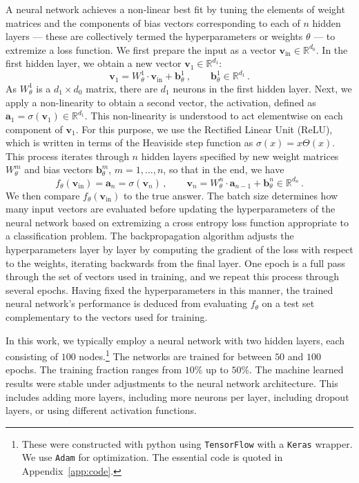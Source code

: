 \documentclass[11pt]{article}
\newcommand\be{\begin{equation}}
\newcommand\ee{\end{equation}}
\numberwithin{equation}{section}
\begin{document}
A neural network achieves a non-linear best fit by tuning the elements of weight matrices and the components of bias vectors corresponding to each of $n$ hidden layers --- these are collectively termed the hyperparameters or weights $\theta$ --- to extremize a loss function.
We first prepare the input as a vector $\mathbf{v}_\text{in}\in\mathbb{R}^{d_0}$.
In the first hidden layer, we obtain a new vector $\mathbf{v}_1\in\mathbb{R}^{d_1}$:
\be
\mathbf{v}_1 = W_\theta^1 \cdot \mathbf{v}_\text{in} + \mathbf{b}_\theta^1 ~, \qquad \mathbf{b}_\theta^1\in\mathbb{R}^{d_1} \,.
\ee
As $W_\theta^1$ is a $d_1\times d_0$ matrix, there are $d_1$ neurons in the first hidden layer.
Next, we apply a non-linearity to obtain a second vector, the activation, defined as $\mathbf{a}_1 = \sigma(\mathbf{v}_1)\in\mathbb{R}^{d_1}$.
This non-linearity is understood to act elementwise on each component of $\mathbf{v}_1$.
For this purpose, we use the Rectified Linear Unit (ReLU), which is written in terms of the Heaviside step function as $\sigma(x) = x\Theta(x)$.
This process iterates through $n$ hidden layers specified by new weight matrices $W_\theta^m$ and bias vectors $\mathbf{b}_\theta^m$, $m=1,\ldots,n$, so that in the end, we have
\be
f_\theta(\mathbf{v}_\text{in}) = \mathbf{a}_n = \sigma(\mathbf{v}_n) \,, \qquad \mathbf{v}_n = W_\theta^n \cdot \mathbf{a}_{n-1} + \bm{b}_\theta^n \in \mathbb{R}^{d_n} \,.
\ee
We then compare $f_\theta(\mathbf{v}_\text{in})$ to the true answer.
The batch size determines how many input vectors are evaluated before updating the hyperparameters of the neural network based on extremizing a cross entropy loss function appropriate to a classification problem.
The backpropagation algorithm adjusts the hyperparameters layer by layer by computing the gradient of the loss with respect to the weights, iterating backwards from the final layer.
One epoch is a full pass through the set of vectors used in training, and we repeat this process through several epochs.
Having fixed the hyperparameters in this manner, the trained neural network's performance is deduced from evaluating $f_\theta$ on a test set complementary to the vectors used for training.

In this work, we typically employ a neural network with two hidden layers, each consisting of $100$ nodes.\footnote{
These were constructed with \textsf{python} using \texttt{TensorFlow} with a \texttt{Keras} wrapper.
We use \texttt{Adam} for optimization.
The essential code is quoted in Appendix~\ref{app:code}.}
The networks are trained for between $50$ and $100$ epochs.
The training fraction ranges from $10\%$ up to $50\%$.
The machine learned results were stable under adjustments to the neural network architecture.
This includes adding more layers, including more neurons per layer, including dropout layers, or using different activation functions.
\end{document}
